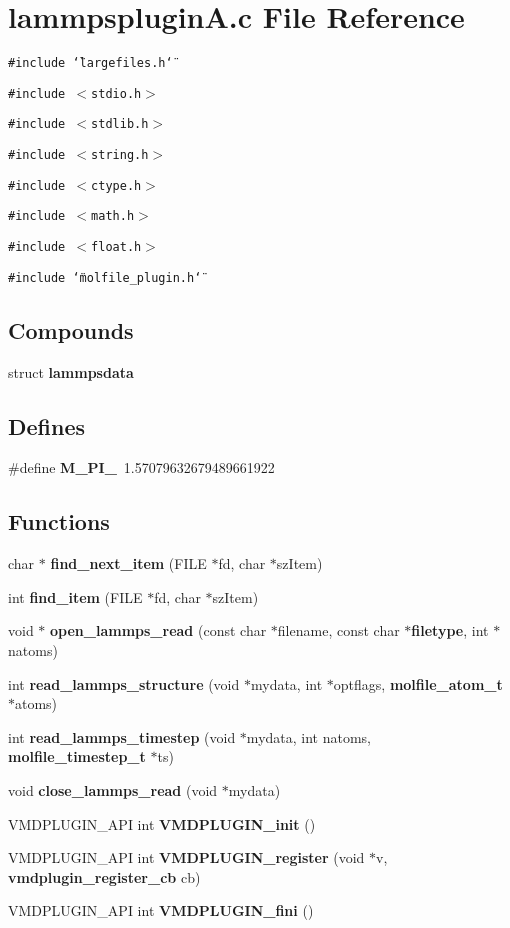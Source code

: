 \section{lammpsplugin\-A.c File Reference}
\label{lammpspluginA_8c}
{\tt \#include \char`\"{}largefiles.h\char`\"{}}\par
{\tt \#include $<$stdio.h$>$}\par
{\tt \#include $<$stdlib.h$>$}\par
{\tt \#include $<$string.h$>$}\par
{\tt \#include $<$ctype.h$>$}\par
{\tt \#include $<$math.h$>$}\par
{\tt \#include $<$float.h$>$}\par
{\tt \#include \char`\"{}molfile\_\-plugin.h\char`\"{}}\par
\subsection*{Compounds}
\begin{CompactItemize}
\item 
struct {\bf lammpsdata}
\end{CompactItemize}
\subsection*{Defines}
\begin{CompactItemize}
\item 
\#define {\bf M\_\-PI\_}\ 1.57079632679489661922
\end{CompactItemize}
\subsection*{Functions}
\begin{CompactItemize}
\item 
char $\ast$ {\bf find\_\-next\_\-item} (FILE $\ast$fd, char $\ast$sz\-Item)
\item 
int {\bf find\_\-item} (FILE $\ast$fd, char $\ast$sz\-Item)
\item 
void $\ast$ {\bf open\_\-lammps\_\-read} (const char $\ast$filename, const char $\ast${\bf filetype}, int $\ast$natoms)
\item 
int {\bf read\_\-lammps\_\-structure} (void $\ast$mydata, int $\ast$optflags, {\bf molfile\_\-atom\_\-t} $\ast$atoms)
\item 
int {\bf read\_\-lammps\_\-timestep} (void $\ast$mydata, int natoms, {\bf molfile\_\-timestep\_\-t} $\ast$ts)
\item 
void {\bf close\_\-lammps\_\-read} (void $\ast$mydata)
\item 
VMDPLUGIN\_\-API int {\bf VMDPLUGIN\_\-init} ()
\item 
VMDPLUGIN\_\-API int {\bf VMDPLUGIN\_\-register} (void $\ast$v, {\bf vmdplugin\_\-register\_\-cb} cb)
\item 
VMDPLUGIN\_\-API int {\bf VMDPLUGIN\_\-fini} ()
\end{CompactItemize}
